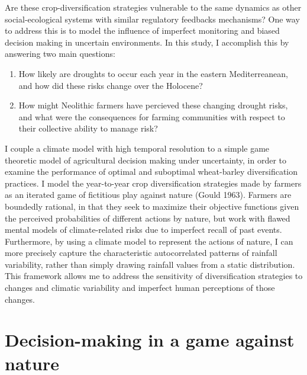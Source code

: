 \documentclass[smallextended]{svjour3}       %
\providecommand{\tightlist}{%
  \setlength{\itemsep}{0pt}\setlength{\parskip}{0pt}}
\begin{document}
Are these crop-diversification strategies vulnerable to the same
dynamics as other social-ecological systems with similar regulatory
feedbacks mechanisms? One way to address this is to model the influence
of imperfect monitoring and biased decision making in uncertain
environments. In this study, I accomplish this by answering two main
questions:

\begin{enumerate}
\def\labelenumi{\arabic{enumi}.}
\tightlist
\item
  How likely are droughts to occur each year in the eastern
  Mediterreanean, and how did these risks change over the Holocene?
\item
  How might Neolithic farmers have percieved these changing drought
  risks, and what were the consequences for farming communities with
  respect to their collective ability to manage risk?
\end{enumerate}

I couple a climate model with high temporal resolution to a simple game
theoretic model of agricultural decision making under uncertainty, in
order to examine the performance of optimal and suboptimal wheat-barley
diversification practices. I model the year-to-year crop diversification
strategies made by farmers as an iterated game of fictitious play
against nature (Gould 1963). Farmers are boundedly rational, in that
they seek to maximize their objective functions given the perceived
probabilities of different actions by nature, but work with flawed
mental models of climate-related risks due to imperfect recall of past
events. Furthermore, by using a climate model to represent the actions
of nature, I can more precisely capture the characteristic
autocorrelated patterns of rainfall variability, rather than simply
drawing rainfall values from a static distribution. This framework
allows me to address the sensitivity of diversification strategies to
changes and climatic variability and imperfect human perceptions of
those changes.

\hypertarget{sec:1}{%
\section{Decision-making in a game against nature}\label{sec:1}}
\end{document}
